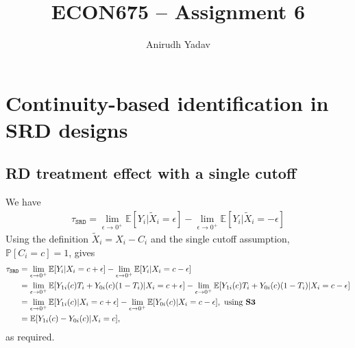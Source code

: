 \documentclass[12pt]{article}
\title{ECON675 -- Assignment 6}
\author{Anirudh Yadav}
\newcommand{\E}{\mathbb{E}}
\newcommand{\Prob}{\mathbb{P}}
\newcommand{\e}{\epsilon}
\begin{document}
\maketitle

\setcounter{tocdepth}{2}
\tableofcontents

\newpage

\section{Continuity-based identification in SRD designs}

\subsection{RD treatment effect with a single cutoff}
We have
\begin{align*}
\tau_{\texttt{SRD}} = \lim_{\e \to 0^+} \E[Y_i | \tilde{X}_i = \e] - \lim_{\e \to 0^+} \E[Y_i | \tilde{X}_i = -\e]
\end{align*}
Using the definition $\tilde X_i = X_i - C_i$ and the single cutoff assumption, $\Prob[C_i = c] = 1$, gives
\begin{align*}
\tau_{\texttt{SRD}} &= \lim_{\e \to 0^+} \E[Y_i | X_i= c+ \e] - \lim_{\e \to 0^+} \E[Y_i | X_i = c -\e]\\
&= \lim_{\e \to 0^+} \E[Y_{1i}(c)T_i + Y_{0i}(c)(1-T_i)| X_i= c+ \e] - \lim_{\e \to 0^+} \E[Y_{1i}(c)T_i + Y_{0i}(c)(1-T_i) | X_i = c -\e]\\
&= \lim_{\e \to 0^+} \E[Y_{1i}(c)| X_i= c+ \e] - \lim_{\e \to 0^+} \E[Y_{0i}(c)| X_i = c -\e], \text{ using \textbf{S3}}\\
&= \E[Y_{1i}(c)-Y_{0i}(c)| X_i= c],
\end{align*}
as required.
\end{document}
